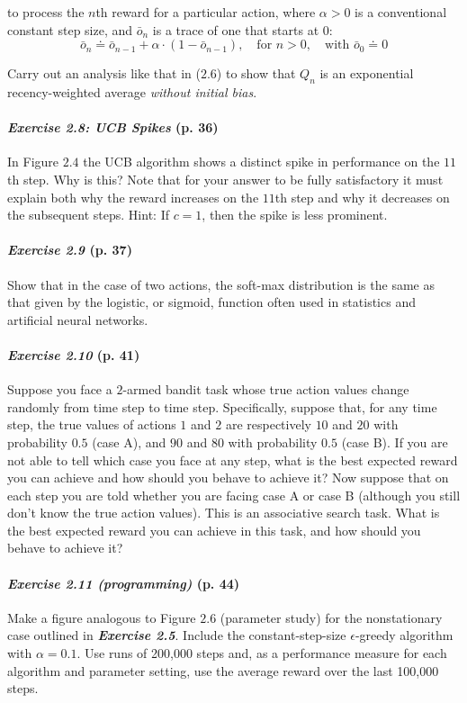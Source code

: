 \documentclass[10pt,a4paper]{article}
\begin{document}
to process the $n$th reward for a particular action, where $\alpha > 0$ is a conventional constant step size, and $\bar{o}_n$ is a trace of one that starts at $0$:
\begin{equation}
\bar{o}_n \doteq \bar{o}_{n-1} + \alpha \cdot (1 - \bar{o}_{n-1}),\quad \textrm{for } n > 0,\quad \textrm{with } \bar{o}_0 \doteq 0
\end{equation}

Carry out an analysis like that in ($2.6$) to show that $Q_n$ is an exponential recency-weighted average \textit{without initial bias}.

\paragraph{\textit{Exercise 2.8: UCB Spikes} (p. 36)} In Figure $2.4$ the UCB algorithm shows a distinct spike
in performance on the $11$th step. Why is this? Note that for your answer to be fully satisfactory it must explain both why the reward increases on the $11$th step and why it decreases on the subsequent steps. Hint: If $c = 1$, then the spike is less prominent.

\paragraph{\textit{Exercise 2.9} (p. 37)} Show that in the case of two actions, the soft-max distribution is the same
as that given by the logistic, or sigmoid, function often used in statistics and artificial
neural networks.

\paragraph{\textit{Exercise 2.10} (p. 41)} Suppose you face a $2$-armed bandit task whose true action values change randomly from time step to time step. Specifically, suppose that, for any time step, the true values of actions $1$ and $2$ are respectively $10$ and $20$ with probability $0.5$ (case
A), and $90$ and $80$ with probability $0.5$ (case B). If you are not able to tell which case you face at any step, what is the best expected reward you can achieve and how should
you behave to achieve it? Now suppose that on each step you are told whether you are
facing case A or case B (although you still don't know the true action values). This is an associative search task. What is the best expected reward you can achieve in this task, and how should you behave to achieve it?

\paragraph{\textit{Exercise 2.11 (programming)} (p. 44)} Make a figure analogous to Figure $2.6$ (parameter study) for the nonstationary case outlined in \textbf{\textit{Exercise 2.5}}. Include the constant-step-size $\epsilon$-greedy algorithm with
$\alpha=0.1$. Use runs of 200,000 steps and, as a performance measure for each algorithm and parameter setting, use the average reward over the last 100,000 steps.
\end{document}

